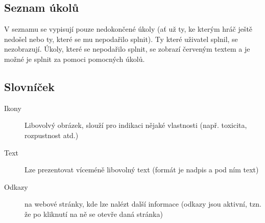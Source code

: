\documentclass[a4paper,12pt]{article}
\begin{document}
\subsection{Seznam úkolů}
V seznamu se vypisují pouze nedokončené úkoly (ať už ty, ke kterým hráč ještě nedošel nebo ty, které se mu nepodařilo splnit). Ty které uživatel splnil, se nezobrazují. Úkoly, které se nepodařilo splnit, se zobrazí červeným textem a je možné je splnit za pomoci pomocných úkolů.
\begin{figure}[H]
\end{figure}
\subsection{Slovníček}
\begin{description}
\item[Ikony] Libovolvý obrázek, slouží pro indikaci nějaké vlastnosti (např. toxicita, rozpustnost atd.)
\item[Text] Lze prezentovat víceméně libovolný text (formát je nadpis a pod ním text)
\item[Odkazy] na webové stránky, kde lze nalézt další informace (odkazy jsou aktivní, tzn. že po kliknutí na ně se otevře daná stránka)
\end{description}
\begin{figure}[H]
\end{figure}
\newpage
\end{document}
